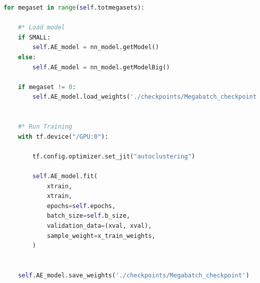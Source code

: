 \begin{lstlisting}[language=Python, style=pythonstyle, label={code:megabatch_training}]
for megaset in range(self.totmegasets):
    
    #* Load model 
    if SMALL:
        self.AE_model = nn_model.getModel()
    else:
        self.AE_model = nn_model.getModelBig()
    
    if megaset != 0:
        self.AE_model.load_weights('./checkpoints/Megabatch_checkpoint')
        
        
    #* Run Training
    with tf.device("/GPU:0"):

        tf.config.optimizer.set_jit("autoclustering")

        self.AE_model.fit(
            xtrain,
            xtrain,
            epochs=self.epochs,
            batch_size=self.b_size,
            validation_data=(xval, xval),
            sample_weight=x_train_weights,
        )
        
    
    self.AE_model.save_weights('./checkpoints/Megabatch_checkpoint')

\end{lstlisting}